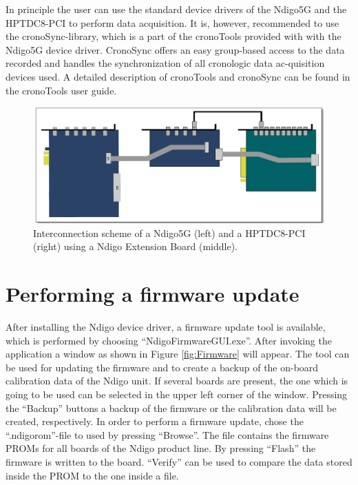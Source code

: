 		In principle the user can use the standard device drivers of the Ndigo5G and the HPTDC8-PCI to perform data acquisition. It is, however, recommended to use the cronoSync-library, which is a part of the cronoTools provided with with the Ndigo5G device driver. CronoSync offers an easy 
group-based access to the data recorded and handles the synchronization of all cronologic data ac-quisition devices used. A detailed description of cronoTools and cronoSync can be found in the cronoTools user guide.

		\begin{figure}[hb]
			\begin{center}
				\includegraphics[width=\textwidth]{figures/InterconNdigo.pdf}
				\caption{\label{fig:InterconNdigo} Interconnection scheme of a Ndigo5G (left) and a HPTDC8-PCI (right) using a Ndigo Extension Board (middle).}
			\end{center}
		\end{figure}
	
	\section{Performing a firmware update}
	
		After installing the Ndigo device driver, a firmware update tool is available, which is performed by choosing ``NdigoFirmwareGUI.exe''. After invoking the application a window as shown in Figure \ref{fig:Firmware} will appear. The tool can be used for updating the firmware and to create a backup of the on-board calibration data of the Ndigo unit. If several boards are present, the one which is going to be used can be selected in the upper left corner of the window. Pressing the ``Backup'' buttons a backup of the firmware or the calibration data will be created, respectively. In order to perform a firmware update, chose the ``.ndigorom''-file to used by pressing ``Browse''. The file contains the firmware PROMs for all boards of the Ndigo product line. By pressing ``Flash'' the firmware is written to the board. ``Verify'' can be used to compare the data stored inside the PROM to the one inside a file.\par
		
